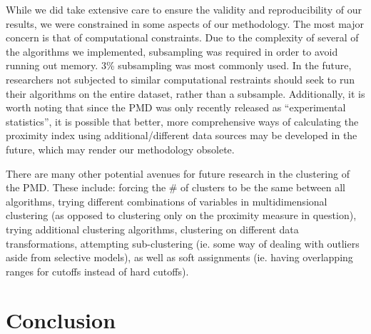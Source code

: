 \documentclass[11pt, a4paper]{article}
\begin{document}
While we did take extensive care to ensure the validity and reproducibility of our results, we were constrained in some aspects of our methodology. The most major concern is that of computational constraints. Due to the complexity of several of the algorithms we implemented, subsampling was required in order to avoid running out memory. 3\% subsampling was most commonly used. In the future, researchers not subjected to similar computational restraints should seek to run their algorithms on the entire dataset, rather than a subsample. Additionally, it is worth noting that since the PMD was only recently released as ``experimental statistics'', it is possible that better, more comprehensive ways of calculating the proximity index using additional/different data sources may be developed in the future, which may render our methodology obsolete.
\par
There are many other potential avenues for future research in the clustering of the PMD. These include: forcing the \# of clusters to be the same between all algorithms, trying different combinations of variables in multidimensional clustering (as opposed to clustering only on the proximity measure in question), trying additional clustering algorithms, clustering on different data transformations, attempting sub-clustering (ie. some way of dealing with outliers aside from selective models), as well as soft assignments (ie. having overlapping ranges for cutoffs instead of hard cutoffs).









\pagebreak
\section{Conclusion}
\end{document}
